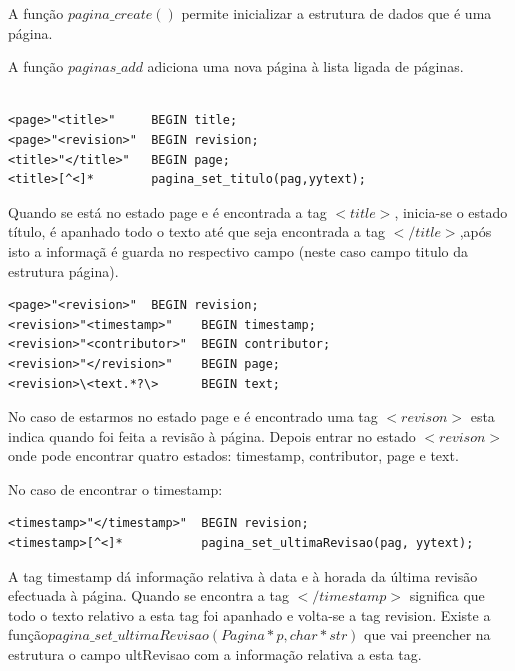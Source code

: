 \documentclass[11pt, a4paper, oneside]{article}
\begin{document}
A função \begin{math}pagina\_create()\end{math} permite inicializar a estrutura de dados que é uma página.

A função \begin{math}paginas\_add\end{math} adiciona uma nova página à lista ligada de páginas.

\begin{verbatim}

<page>"<title>"     BEGIN title;
<page>"<revision>"  BEGIN revision;
<title>"</title>"   BEGIN page;
<title>[^<]*        pagina_set_titulo(pag,yytext);

\end{verbatim}

Quando se está no estado page e é encontrada a tag \begin{math}<title>\end{math}, inicia-se o estado título, é apanhado todo o texto até que seja encontrada a tag \begin{math}</title>\end{math},após isto a informaçã é guarda no respectivo campo (neste caso campo titulo da estrutura página).


\begin{verbatim}
<page>"<revision>"  BEGIN revision;
<revision>"<timestamp>"    BEGIN timestamp;
<revision>"<contributor>"  BEGIN contributor;
<revision>"</revision>"    BEGIN page;
<revision>\<text.*?\>      BEGIN text;
\end{verbatim}


No caso de estarmos no estado page e é encontrado uma tag \begin{math}<revison>\end{math} esta indica quando foi feita a revisão à página. Depois entrar no estado \begin{math}<revison>\end{math} onde pode encontrar quatro estados: timestamp, contributor, page e text.

No caso de encontrar o timestamp:
\begin{verbatim}
<timestamp>"</timestamp>"  BEGIN revision;
<timestamp>[^<]*           pagina_set_ultimaRevisao(pag, yytext);
\end{verbatim}

A tag timestamp dá informação relativa à data e à horada da última revisão efectuada à página.
Quando se encontra a tag \begin{math}</timestamp>\end{math} significa que todo o texto relativo a esta tag foi apanhado e volta-se a tag revision.
Existe a função\begin{math}pagina\_set\_ultimaRevisao(Pagina* p, char* str)\end{math} que vai preencher na estrutura o campo ultRevisao com a informação relativa a esta tag.
\end{document}
